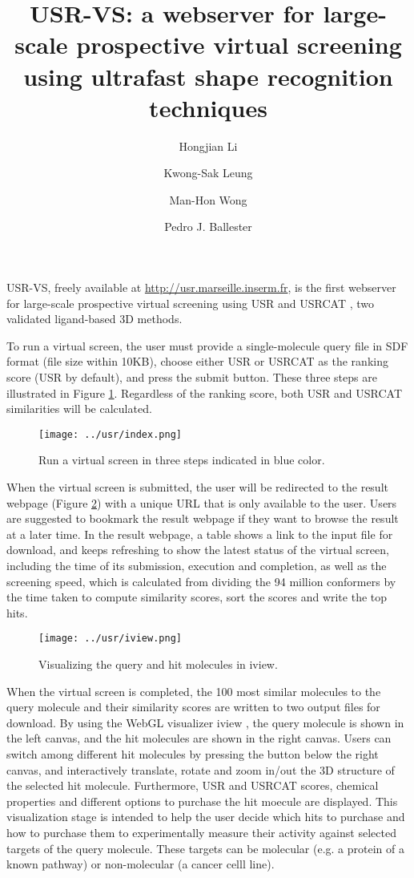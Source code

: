 \documentclass[a4paper,11pt]{article}
\title{USR-VS: a webserver for large-scale prospective virtual screening using ultrafast shape recognition techniques}
\author[1]{Hongjian Li}
\author[1]{Kwong-Sak Leung}
\author[1]{Man-Hon Wong}
\author[2]{Pedro J. Ballester}
\affil[1]{Department of Computer Science and Engineering, Chinese University of Hong Kong.}
\affil[ ]{\{hjli,ksleung,mhwong\}@cse.cuhk.edu.hk}
\affil[2]{Cancer Research Center of Marseille, INSERM U1068; Institut Paoli-Calmettes; Aix-Marseille Universit\'{e}; CNRS UMR7258, Marseille, France.}
\affil[ ]{pedro.ballester@inserm.fr}
\begin{document}
\maketitle
\thispagestyle{title}

USR-VS, freely available at \url{http://usr.marseille.inserm.fr}, is the first webserver for large-scale prospective virtual screening using USR \cite{1379} and USRCAT \cite{1331}, two validated ligand-based 3D methods.

To run a virtual screen, the user must provide a single-molecule query file in SDF format (file size within 10KB), choose either USR or USRCAT as the ranking score (USR by default), and press the submit button. These three steps are illustrated in Figure \ref{index}. Regardless of the ranking score, both USR and USRCAT similarities will be calculated.

\begin{figure}
\texttt{[image: ../usr/index.png]}
\caption{Run a virtual screen in three steps indicated in blue color.}
\label{index}
\end{figure}

When the virtual screen is submitted, the user will be redirected to the result webpage (Figure \ref{iview}) with a unique URL that is only available to the user. Users are suggested to bookmark the result webpage if they want to browse the result at a later time. In the result webpage, a table shows a link to the input file for download, and keeps refreshing to show the latest status of the virtual screen, including the time of its submission, execution and completion, as well as the screening speed, which is calculated from dividing the 94 million conformers by the time taken to compute similarity scores, sort the scores and write the top hits.

\begin{figure}
\texttt{[image: ../usr/iview.png]}
\caption{Visualizing the query and hit molecules in iview.}
\label{iview}
\end{figure}

When the virtual screen is completed, the 100 most similar molecules to the query molecule and their similarity scores are written to two output files for download. By using the WebGL visualizer iview \cite{1366}, the query molecule is shown in the left canvas, and the hit molecules are shown in the right canvas. Users can switch among different hit molecules by pressing the button below the right canvas, and interactively translate, rotate and zoom in/out the 3D structure of the selected hit molecule. Furthermore, USR and USRCAT scores, chemical properties and different options to purchase the hit moecule are displayed. This visualization stage is intended to help the user decide which hits to purchase and how to purchase them to experimentally measure their activity against selected targets of the query molecule. These targets can be molecular (e.g. a protein of a known pathway) or non-molecular (a cancer celll line).



\end{document}
